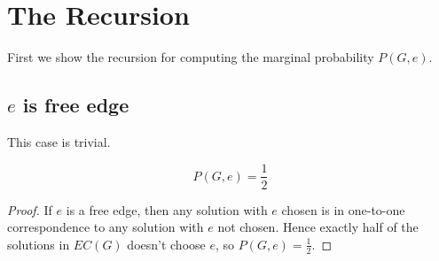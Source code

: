 
\section{The Recursion}

First we show the recursion for computing the marginal probability $P(G, e)$.

\subsection{$e$ is free edge}
This case is trivial.
\begin{Prop}
	\[P(G,e) = \frac{1}{2}\]
\end{Prop}
\begin{proof}
	If $e$ is a free edge, then any solution with $e$ chosen is in one-to-one correspondence to any solution with $e$ not chosen. Hence exactly half of the solutions in $EC(G)$ doesn't choose $e$, so $P(G, e) = \frac{1}{2}$.
\end{proof}

